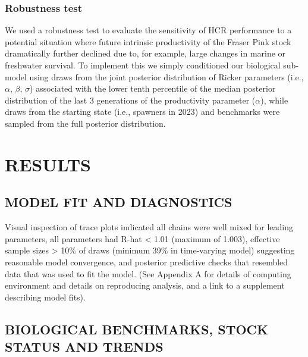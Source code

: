 \documentclass[french,11pt]{book}
\begin{document}
\hypertarget{robustness-test}{%
\subsubsection{Robustness test}\label{robustness-test}}

We used a robustness test to evaluate the sensitivity of HCR performance to a potential situation where future intrinsic productivity of the Fraser Pink stock dramatically further declined due to, for example, large changes in marine or freshwater survival. To implement this we simply conditioned our biological sub-model using draws from the joint posterior distribution of Ricker parameters (i.e., \(\alpha\), \(\beta\), \(\sigma\)) associated with the lower tenth percentile of the median posterior distribution of the last 3 generations of the productivity parameter (\(\alpha\)), while draws from the starting state (i.e., spawners in 2023) and benchmarks were sampled from the full posterior distribution.

\hypertarget{results}{%
\section{RESULTS}\label{results}}

\hypertarget{model-fit-and-diagnostics}{%
\subsection{MODEL FIT AND DIAGNOSTICS}\label{model-fit-and-diagnostics}}

Visual inspection of trace plots indicated all chains were well mixed for leading parameters, all parameters had R-hat \textless{} 1.01 (maximum of 1.003), effective sample sizes \textgreater{} 10\% of draws (minimum 39\% in time-varying model) suggesting reasonable model convergence, and posterior predictive checks that resembled data that was used to fit the model. (See Appendix A for details of computing environment and details on reproducing analysis, and a link to a supplement describing model fits).

\hypertarget{biological-benchmarks-stock-status-and-trends}{%
\subsection{BIOLOGICAL BENCHMARKS, STOCK STATUS AND TRENDS}\label{biological-benchmarks-stock-status-and-trends}}
\end{document}
